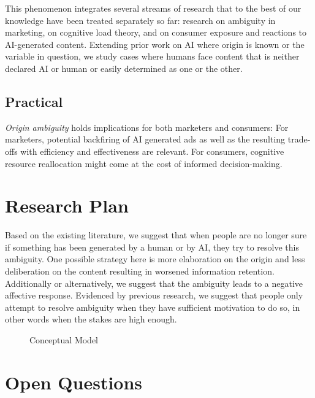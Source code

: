 \documentclass[
  letterpaper,
  DIV=11,
  numbers=noendperiod]{scrartcl}
\makeatletter
\newcommand*\pandocbounded[1]{%
  \sbox\pandoc@box{#1}%
  \Gscale@div\@tempa{\textheight}{\dimexpr\ht\pandoc@box+\dp\pandoc@box\relax}%
  \Gscale@div\@tempb{\linewidth}{\wd\pandoc@box}%
  \ifdim\@tempb\p@<\@tempa\p@\let\@tempa\@tempb\fi%
  \ifdim\@tempa\p@<\p@\scalebox{\@tempa}{\usebox\pandoc@box}%
  \else\usebox{\pandoc@box}%
  \fi%
}
\makeatother
\begin{document}
This phenomenon integrates several streams of research that to the best
of our knowledge have been treated separately so far: research on
ambiguity in marketing, on cognitive load theory, and on consumer
exposure and reactions to AI-generated content. Extending prior work on
AI where origin is known or the variable in question, we study cases
where humans face content that is neither declared AI or human or easily
determined as one or the other.

\subsection{Practical}\label{practical}

\emph{Origin ambiguity} holds implications for both marketers and
consumers: For marketers, potential backfiring of AI generated ads as
well as the resulting trade-offs with efficiency and effectiveness are
relevant. For consumers, cognitive resource reallocation might come at
the cost of informed decision-making.

\section{Research Plan}\label{research-plan}

Based on the existing literature, we suggest that when people are no
longer sure if something has been generated by a human or by AI, they
try to resolve this ambiguity. One possible strategy here is more
elaboration on the origin and less deliberation on the content resulting
in worsened information retention. Additionally or alternatively, we
suggest that the ambiguity leads to a negative affective response.
Evidenced by previous research, we suggest that people only attempt to
resolve ambiguity when they have sufficient motivation to do so, in
other words when the stakes are high enough.

\begin{figure}

\centering{

\pandocbounded{}

}

\caption{\label{fig-conceptual-model}Conceptual Model}

\end{figure}%

\section{Open Questions}\label{open-questions}
\end{document}
